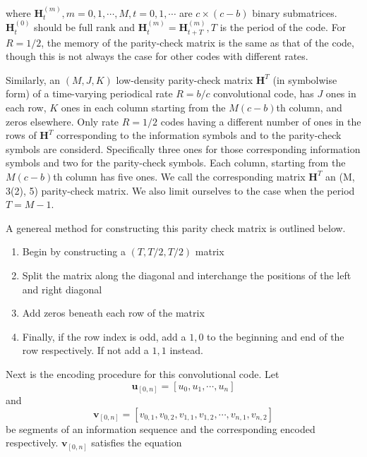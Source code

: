 \documentclass[11pt, oneside, dvipdfmx]{book}
\begin{document}
where 
$\boldsymbol{H}_{t}^{(m)}, m=0,1, \cdots, M, t=0,1, \cdots$ are $c \times (c-b)$ binary submatrices. $\boldsymbol{H}_{t}^{(0)}$ should be full rank and $\boldsymbol{H}_{t}^{(m)}=\boldsymbol{H}_{t+T}^{(m)}, T$ is the period of the code.
For $R=1/2$, the memory of the parity-check matrix is the same as that of the code, though this is not always the case for other codes with different rates. 

Similarly,
an $(M, J, K)$ low-density parity-check matrix $\boldsymbol{H}^{T}$ (in symbolwise form) of a time-varying periodical rate $R = b/c$ convolutional
code, has $J$ ones in each row, $K$
ones in each column starting from the $M(c-b)$th column, and zeros
elsewhere. Only rate $R=1/2$ codes 
having a different number of ones in the rows of $\boldsymbol{H}^{T}$ corresponding
to the information symbols and to the parity-check symbols are considerd. Specifically  three ones for those corresponding information symbols
and two for the parity-check symbols. Each column, starting from
the $M(c -b)$th column has five ones. We call the corresponding matrix $\boldsymbol{H}^{T}$ an (M, 3(2), 5)
parity-check matrix. We also limit ourselves to the case when the
period $T=M-1$.

A genereal method for constructing this parity check matrix is outlined below.

\begin{enumerate}
\item Begin by constructing a $(T,T/2,T/2)$ matrix

\item Split the matrix along the diagonal and interchange the positions of the left and right diagonal

\item Add zeros beneath each row of the matrix

\item Finally, if the row index is odd, add a $1 ,0$ to the beginning and end of the row respectively. If not add a $1,1$ instead.

\end{enumerate}

Next is the encoding procedure for this convolutional code. Let \begin{equation*}
\boldsymbol{u}_{[0, n]}=\left[u_{0}, u_{1}, \cdots, u_{n}\right]
\end{equation*} and \begin{equation*}
\boldsymbol{v}_{[0, n]}=\left[v_{0,1}, v_{0,2}, v_{1,1}, v_{1,2}, \cdots, v_{n, 1}, v_{n, 2}\right]
\end{equation*}
be segments of an information sequence and the corresponding encoded respectively. 
$\boldsymbol{v}_{[0, n]}$ satisfies the equation
\end{document}

